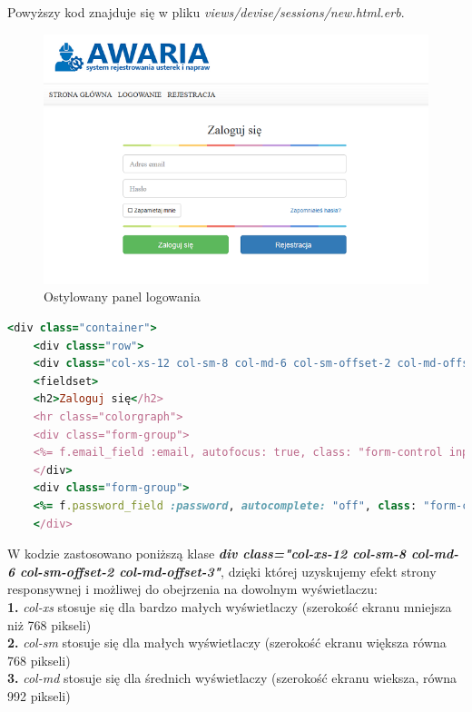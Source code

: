 \documentclass[openright]{xmgr}
\begin{document}
	Powyższy kod znajduje się w pliku
	\textit{views/devise/sessions/new.html.erb}. 
	
	\begin{figure}[!tbh]
		\centering
		\includegraphics[width=\linewidth]{image/panelhtml}
		\caption{Ostylowany panel logowania}
	\end{figure}
\newpage
	\begin{lstlisting}[language=Ruby,lineskip={-1pt},caption= Kod obudowany kodem HTML]
	<div class="container">
	<div class="row">
	<div class="col-xs-12 col-sm-8 col-md-6 col-sm-offset-2 col-md-offset-3">
	<fieldset>
	<h2>Zaloguj się</h2>
	<hr class="colorgraph">
	<div class="form-group">
	<%= f.email_field :email, autofocus: true, class: "form-control input-lg", placeholder: "Adres email" %>
	</div>
	<div class="form-group">
	<%= f.password_field :password, autocomplete: "off", class: "form-control input-lg", placeholder: "Hasło"  %>
	</div>
	\end{lstlisting}

W kodzie zastosowano poniższą klase \textbf{\textit{div class="col-xs-12 col-sm-8 col-md-6 col-sm-offset-2 col-md-offset-3"}}, dzięki której uzyskujemy efekt strony responsywnej i możliwej do obejrzenia na dowolnym wyświetlaczu:\\
\textbf{1.} \textit{col-xs} stosuje się dla bardzo małych wyświetlaczy (szerokość ekranu mniejsza niż 768 pikseli)\\
\textbf{2.} \textit{col-sm} stosuje się dla małych wyświetlaczy (szerokość ekranu większa równa 768 pikseli)\\
\textbf{3.} \textit{col-md} stosuje się dla średnich wyświetlaczy (szerokość ekranu wieksza, równa 992 pikseli)\\
\end{document}
